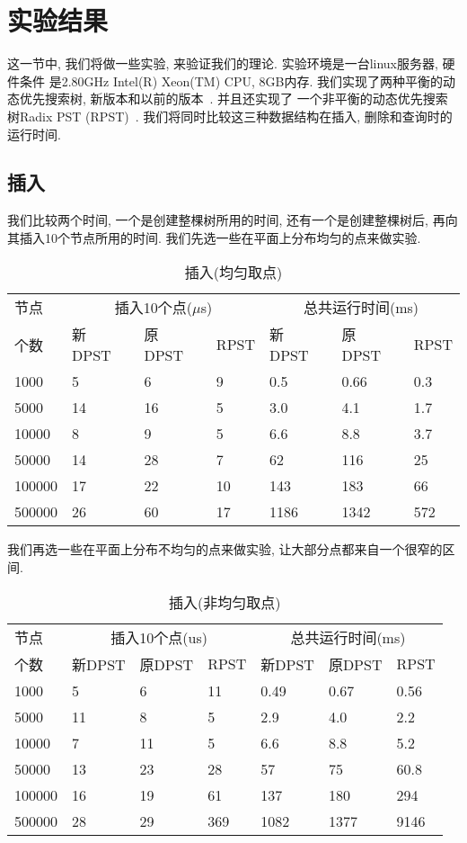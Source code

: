 \documentclass[a4paper]{article}
\begin{document}
\section{实验结果}

这一节中, 我们将做一些实验, 来验证我们的理论. 实验环境是一台linux服务器, 硬件条件
是2.80GHz Intel(R) Xeon(TM) CPU, 8GB内存. 
我们实现了两种平衡的动态优先搜索树, 新版本和以前的版本~\cite{Edward_04}. 并且还实现了
一个非平衡的动态优先搜索树Radix PST (RPST)~\cite{Edward_04}. 我们将同时比较这三种数据结构在插入, 删除和查询时的运行时间. 

\subsection{插入}
我们比较两个时间, 一个是创建整棵树所用的时间, 还有一个是创建整棵树后, 再向其插入10个节点所用的时间. 我们先选一些在平面上分布均匀的点来做实验. 
\begin{table}[ht]
\centering
\begin{tabular}{|p{1.1cm}|p{0.8cm}|p{0.8cm}|p{0.8cm}|p{0.8cm}|p{0.8cm}|p{0.8cm}|}
\hline 节点 & \multicolumn{3}{|c|}{插入10个点($\mu$s)} & \multicolumn{3}{|c|}{总共运行时间(ms)}\\
\cline{2-7}
个数 & 新 DPST & 原 DPST  & RPST & 新 DPST & 原 DPST & RPST\\
\hline 1000 & 5 & 6 & 9 & 0.5 & 0.66 & 0.3\\
\hline 5000 & 14 & 16 & 5 & 3.0 & 4.1 & 1.7\\
\hline 10000 & 8 & 9 & 5 & 6.6 & 8.8 & 3.7\\
\hline 50000 & 14 & 28 & 7 & 62 & 116 & 25\\
\hline 100000 & 17 & 22 & 10 & 143 & 183 & 66\\
\hline 500000 & 26 & 60 & 17 & 1186 & 1342 & 572\\
\hline
\end{tabular}
\caption{插入(均匀取点)}
\end{table}

我们再选一些在平面上分布不均匀的点来做实验, 让大部分点都来自一个很窄的区间.

\begin{table}[ht]
\centering
\begin{tabular}{|p{1.1cm}|p{0.8cm}|p{0.8cm}|p{0.8cm}|p{0.8cm}|p{0.8cm}|p{0.8cm}|}
\hline 节点 & \multicolumn{3}{|c|}{插入10个点(us)} & \multicolumn{3}{|c|}{总共运行时间(ms)}\\
\cline{2-7}
个数
& 新DPST & 原DPST  & RPST & 新DPST & 原DPST & RPST\\
\hline 1000 & 5 & 6 & 11 & 0.49 & 0.67 & 0.56\\
\hline 5000 & 11 & 8 & 5 & 2.9 & 4.0 & 2.2\\
\hline 10000 & 7 & 11 & 5 & 6.6 & 8.8 & 5.2\\
\hline 50000 & 13 & 23 & 28 & 57 & 75 & 60.8\\
\hline 100000 & 16 & 19 & 61 & 137 & 180 & 294\\
\hline 500000 & 28 & 29 & 369 & 1082 & 1377 & 9146\\
\hline
\end{tabular}
\caption{插入(非均匀取点)}
\end{table}
\end{document}
